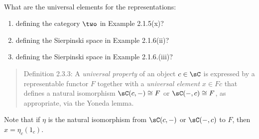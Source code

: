 \documentclass[../../main]{subfiles}
\begin{document}
\paragraph{}
\begin{exercise}
What are the universal elements for the representations:
\begin{enumerate}
\item defining the category $\two$ in Example 2.1.5(x)?
\item defining the Sierpinski space in Example 2.1.6(ii)?
\item defining the Sierpinski space in Example 2.1.6.(iii)?
\end{enumerate}
\end{exercise}

\begin{quote}
Definition 2.3.3: A \emph{universal property} of an object $c\in\sC$ is 
expressed by a representable functor $F$ together with a \emph{universal 
element} $x\in Fc$ that defines a natural isomorphism $\sC(c,-)\cong F$ or 
$\sC(-,c)\cong F$, as appropriate, via the Yoneda lemma.
\end{quote}

Note that if $\eta$ is the natural isomorphism from $\sC(c,-)$ or $\sC(-,c)$ to 
$F$, then $x=\eta_c(1_c)$.
\end{document}
